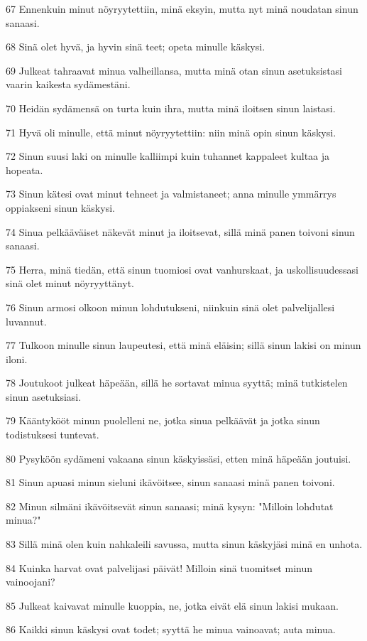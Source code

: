 \par 67 Ennenkuin minut nöyryytettiin, minä eksyin, mutta nyt minä noudatan sinun sanaasi.
\par 68 Sinä olet hyvä, ja hyvin sinä teet; opeta minulle käskysi.
\par 69 Julkeat tahraavat minua valheillansa, mutta minä otan sinun asetuksistasi vaarin kaikesta sydämestäni.
\par 70 Heidän sydämensä on turta kuin ihra, mutta minä iloitsen sinun laistasi.
\par 71 Hyvä oli minulle, että minut nöyryytettiin: niin minä opin sinun käskysi.
\par 72 Sinun suusi laki on minulle kalliimpi kuin tuhannet kappaleet kultaa ja hopeata.
\par 73 Sinun kätesi ovat minut tehneet ja valmistaneet; anna minulle ymmärrys oppiakseni sinun käskysi.
\par 74 Sinua pelkääväiset näkevät minut ja iloitsevat, sillä minä panen toivoni sinun sanaasi.
\par 75 Herra, minä tiedän, että sinun tuomiosi ovat vanhurskaat, ja uskollisuudessasi sinä olet minut nöyryyttänyt.
\par 76 Sinun armosi olkoon minun lohdutukseni, niinkuin sinä olet palvelijallesi luvannut.
\par 77 Tulkoon minulle sinun laupeutesi, että minä eläisin; sillä sinun lakisi on minun iloni.
\par 78 Joutukoot julkeat häpeään, sillä he sortavat minua syyttä; minä tutkistelen sinun asetuksiasi.
\par 79 Kääntykööt minun puolelleni ne, jotka sinua pelkäävät ja jotka sinun todistuksesi tuntevat.
\par 80 Pysyköön sydämeni vakaana sinun käskyissäsi, etten minä häpeään joutuisi.
\par 81 Sinun apuasi minun sieluni ikävöitsee, sinun sanaasi minä panen toivoni.
\par 82 Minun silmäni ikävöitsevät sinun sanaasi; minä kysyn: "Milloin lohdutat minua?"
\par 83 Sillä minä olen kuin nahkaleili savussa, mutta sinun käskyjäsi minä en unhota.
\par 84 Kuinka harvat ovat palvelijasi päivät! Milloin sinä tuomitset minun vainoojani?
\par 85 Julkeat kaivavat minulle kuoppia, ne, jotka eivät elä sinun lakisi mukaan.
\par 86 Kaikki sinun käskysi ovat todet; syyttä he minua vainoavat; auta minua.
